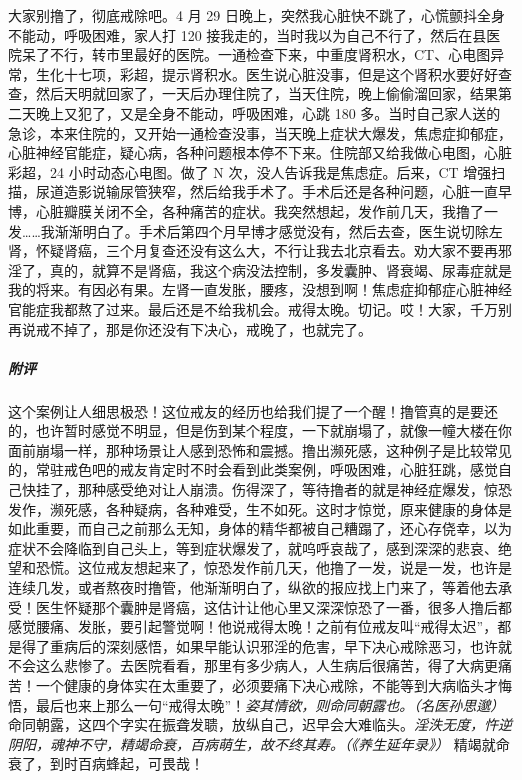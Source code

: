 \begin{case}
    大家别撸了，彻底戒除吧。4 月 29 日晚上，突然我心脏快不跳了，心慌颤抖全身不能动，呼吸困难，家人打 120 接我走的，当时我以为自己不行了，然后在县医院呆了不行，转市里最好的医院。一通检查下来，中重度肾积水，CT、心电图异常，生化十七项，彩超，提示肾积水。医生说心脏没事，但是这个肾积水要好好查查，然后天明就回家了，一天后办理住院了，当天住院，晚上偷偷溜回家，结果第二天晚上又犯了，又是全身不能动，呼吸困难，心跳 180 多。当时自己家人送的急诊，本来住院的，又开始一通检查没事，当天晚上症状大爆发，焦虑症抑郁症，心脏神经官能症，疑心病，各种问题根本停不下来。住院部又给我做心电图，心脏彩超，24 小时动态心电图。做了 N 次，没人告诉我是焦虑症。后来，CT 增强扫描，尿道造影说输尿管狭窄，然后给我手术了。手术后还是各种问题，心脏一直早博，心脏瓣膜关闭不全，各种痛苦的症状。我突然想起，发作前几天，我撸了一发……我渐渐明白了。手术后第四个月早博才感觉没有，然后去查，医生说切除左肾，怀疑肾癌，三个月复查还没有这么大，不行让我去北京看去。劝大家不要再邪淫了，真的，就算不是肾癌，我这个病没法控制，多发囊肿、肾衰竭、尿毒症就是我的将来。有因必有果。左肾一直发胀，腰疼，没想到啊！焦虑症抑郁症心脏神经官能症我都熬了过来。最后还是不给我机会。戒得太晚。切记。哎！大家，千万别再说戒不掉了，那是你还没有下决心，戒晚了，也就完了。
    \subparagraph{附评} 这个案例让人细思极恐！这位戒友的经历也给我们提了一个醒！撸管真的是要还的，也许暂时感觉不明显，但是伤到某个程度，一下就崩塌了，就像一幢大楼在你面前崩塌一样，那种场景让人感到恐怖和震撼。撸出濒死感，这种例子是比较常见的，常驻戒色吧的戒友肯定时不时会看到此类案例，呼吸困难，心脏狂跳，感觉自己快挂了，那种感受绝对让人崩溃。伤得深了，等待撸者的就是神经症爆发，惊恐发作，濒死感，各种疑病，各种难受，生不如死。这时才惊觉，原来健康的身体是如此重要，而自己之前那么无知，身体的精华都被自己糟蹋了，还心存侥幸，以为症状不会降临到自己头上，等到症状爆发了，就呜呼哀哉了，感到深深的悲哀、绝望和恐慌。这位戒友想起来了，惊恐发作前几天，他撸了一发，说是一发，也许是连续几发，或者熬夜时撸管，他渐渐明白了，纵欲的报应找上门来了，等着他去承受！医生怀疑那个囊肿是肾癌，这估计让他心里又深深惊恐了一番，很多人撸后都感觉腰痛、发胀，要引起警觉啊！他说戒得太晚！之前有位戒友叫“戒得太迟”，都是得了重病后的深刻感悟，如果早能认识邪淫的危害，早下决心戒除恶习，也许就不会这么悲惨了。去医院看看，那里有多少病人，人生病后很痛苦，得了大病更痛苦！一个健康的身体实在太重要了，必须要痛下决心戒除，不能等到大病临头才悔悟，最后也来上那么一句“戒得太晚”！\textit{姿其情欲，则命同朝露也。（名医孙思邈）} 命同朝露，这四个字实在振聋发聩，放纵自己，迟早会大难临头。\textit{淫泆无度，忤逆阴阳，魂神不守，精竭命衰，百病萌生，故不终其寿。（《养生延年录》）} 精竭就命衰了，到时百病蜂起，可畏哉！
\end{case}

